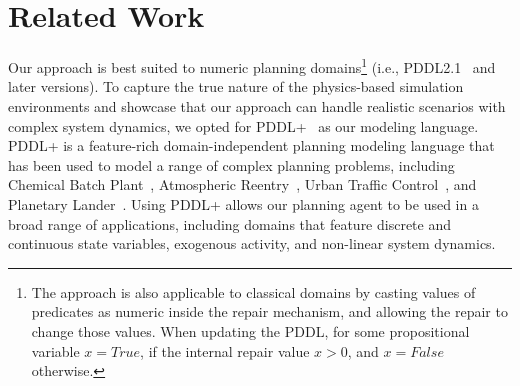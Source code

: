 \documentclass[letterpaper]{article} %
\newcommand{\hydra}{\textsc{Hydra}\xspace} %
\begin{document}







\section{Related Work}

Our approach is best suited to numeric planning domains\footnote{The approach is also applicable to classical domains by casting values of predicates as numeric inside the repair mechanism, and allowing the repair to change those values. When updating the PDDL, for some propositional variable $x=True$, if the internal repair value $x>0$, and $x=False$ otherwise.} (i.e., PDDL2.1~\cite{fox2003pddl2} and later versions). To capture the true nature of the physics-based simulation environments and showcase that our approach can handle realistic scenarios with complex system dynamics, we opted for PDDL+~\cite{fox2006modelling} as our modeling language.
PDDL+ is a feature-rich domain-independent planning modeling language that has been used to model a range of complex planning problems, including Chemical Batch Plant~\cite{della2010pddl+}, Atmospheric Reentry~\cite{piotrowski2018heuristics}, Urban Traffic Control~\cite{vallati2016efficient}, and Planetary Lander~\cite{della2010resource}.
Using PDDL+ allows our planning agent to be used in a broad range of applications, including domains that feature discrete and continuous state variables, exogenous activity, and non-linear system dynamics.
\end{document}
